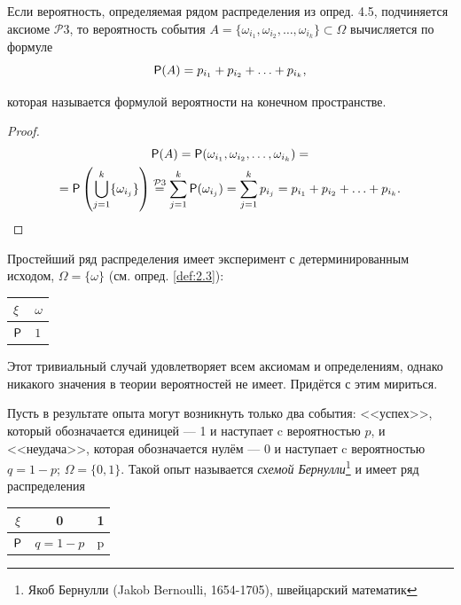 \begin{deflemma}
	\label{def:4.6}
Если  вероятность, определяемая рядом распределения из опред. 4.5, подчиняется аксиоме $\mathcal{P}3$, то вероятность события $A = \{\omega_{i_1} , \omega_{i_2} , \ldots ,  \omega_{i_k} \} \subset \Omega$ вычисляется по формуле
%
$$\P(A) = p_{i_1} + p_{i_2} + \ldots + p_{i_k} ,$$

которая называется формулой вероятности на конечном пространстве.
\end{deflemma}
\begin{proof}
\begin{gather*}
 	\P(A) = \P (\omega_{i_1} , \omega_{i_2} , \ldots , \omega_{i_k}) =\\= \P \left( \bigcup\limits_{j=1}^k \{\omega_{i_j} \} \right) \stackrel{\mathcal{P}3}{=} \sum_{j=1}^{k} \P(\omega_{i_j}) = \sum_{j=1}^{k} p_{i_j} = p_{i_1} + p_{i_2} + \ldots + p_{i_k}.
\end{gather*}
\end{proof} 
\begin{example}
	\label{ex:4.7}
Простейший ряд распределения имеет эксперимент с детерминированным исходом, $\Omega = \{ \omega \}$ (см. опред. \ref{def:2.3}):
\begin{center}
	\begin{tabular}{|l|l|}
		\hline
		$\xi$ & $\omega$  \\ \hline
		$\P$  & $1$  \\ \hline
	\end{tabular}
\end{center}
Этот тривиальный случай удовлетворяет всем аксиомам и определениям, однако никакого значения в теории вероятностей не имеет. Придётся с этим
мириться.
\end{example}
\begin{definition}
	\label{def:4.8}
	Пусть в результате опыта могут возникнуть только
два события: <<успех>>, который обозначается единицей — 1 и наступает c вероятностью $p$, и <<неудача>>, которая обозначается нулём — 0 и наступает c
вероятностью $q = 1−p$; $\Omega = \{0, 1\}$. Такой опыт называется \textit{схемой Бернулли}\footnote{
	Якоб Бернулли (Jakob Bernoulli, 1654-1705), швейцарский математик
}
и имеет ряд распределения

\begin{center}
	\begin{tabular}{|c|c|c|}
		\hline
		$\xi$ & 0 & 1  \\ \hline
		$\P$  & $q=1-p$ & p \\ \hline
	\end{tabular}
\end{center}

\end{definition}

